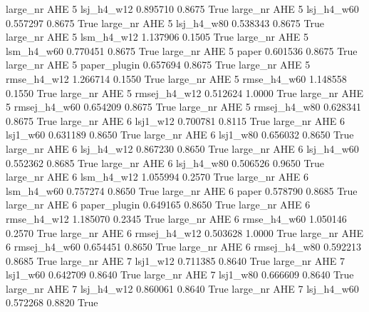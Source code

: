   large_nr      AHE                 5   lsj_h4_w12    0.895710      0.8675    True
  large_nr      AHE                 5   lsj_h4_w60    0.557297      0.8675    True
  large_nr      AHE                 5   lsj_h4_w80    0.538343      0.8675    True
  large_nr      AHE                 5   lsm_h4_w12    1.137906      0.1505    True
  large_nr      AHE                 5   lsm_h4_w60    0.770451      0.8675    True
  large_nr      AHE                 5        paper    0.601536      0.8675    True
  large_nr      AHE                 5 paper_plugin    0.657694      0.8675    True
  large_nr      AHE                 5  rmse_h4_w12    1.266714      0.1550    True
  large_nr      AHE                 5  rmse_h4_w60    1.148558      0.1550    True
  large_nr      AHE                 5 rmsej_h4_w12    0.512624      1.0000    True
  large_nr      AHE                 5 rmsej_h4_w60    0.654209      0.8675    True
  large_nr      AHE                 5 rmsej_h4_w80    0.628341      0.8675    True
  large_nr      AHE                 6     lsj1_w12    0.700781      0.8115    True
  large_nr      AHE                 6     lsj1_w60    0.631189      0.8650    True
  large_nr      AHE                 6     lsj1_w80    0.656032      0.8650    True
  large_nr      AHE                 6   lsj_h4_w12    0.867230      0.8650    True
  large_nr      AHE                 6   lsj_h4_w60    0.552362      0.8685    True
  large_nr      AHE                 6   lsj_h4_w80    0.506526      0.9650    True
  large_nr      AHE                 6   lsm_h4_w12    1.055994      0.2570    True
  large_nr      AHE                 6   lsm_h4_w60    0.757274      0.8650    True
  large_nr      AHE                 6        paper    0.578790      0.8685    True
  large_nr      AHE                 6 paper_plugin    0.649165      0.8650    True
  large_nr      AHE                 6  rmse_h4_w12    1.185070      0.2345    True
  large_nr      AHE                 6  rmse_h4_w60    1.050146      0.2570    True
  large_nr      AHE                 6 rmsej_h4_w12    0.503628      1.0000    True
  large_nr      AHE                 6 rmsej_h4_w60    0.654451      0.8650    True
  large_nr      AHE                 6 rmsej_h4_w80    0.592213      0.8685    True
  large_nr      AHE                 7     lsj1_w12    0.711385      0.8640    True
  large_nr      AHE                 7     lsj1_w60    0.642709      0.8640    True
  large_nr      AHE                 7     lsj1_w80    0.666609      0.8640    True
  large_nr      AHE                 7   lsj_h4_w12    0.860061      0.8640    True
  large_nr      AHE                 7   lsj_h4_w60    0.572268      0.8820    True
